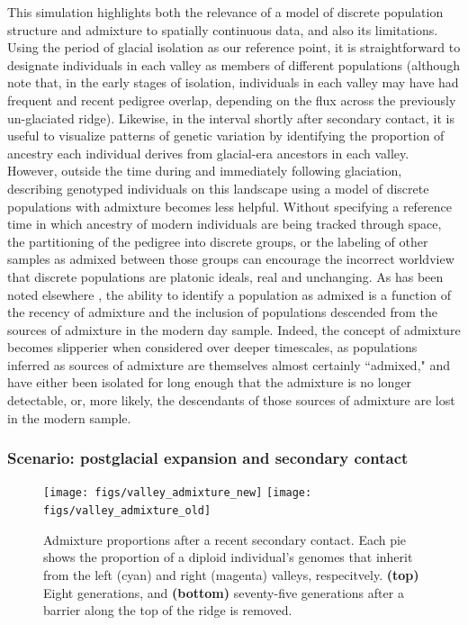 \documentclass{ar-1col}
\begin{document}
This simulation highlights both the relevance of 
a model of discrete population structure and admixture
to spatially continuous data, 
and also its limitations.
Using the period of glacial isolation as our reference point, 
it is straightforward to designate individuals in each valley 
as members of different populations 
(although note that, in the early stages of isolation, 
individuals in each valley may have had frequent 
and recent pedigree overlap, 
depending on the flux across the previously un-glaciated ridge).
Likewise, 
in the interval shortly after secondary contact, 
it is useful to visualize patterns of genetic variation 
by identifying the proportion of ancestry 
each individual derives from glacial-era ancestors in each valley.
However, 
outside the time during and immediately following glaciation, 
describing genotyped individuals on this landscape 
using a model of discrete populations with admixture 
becomes less helpful.
Without specifying a reference time in which ancestry 
of modern individuals are being tracked through space, 
the partitioning of the pedigree into discrete groups, 
or the labeling of other samples as admixed between those groups
can encourage the incorrect worldview that discrete populations are platonic ideals,
real and unchanging.
As has been noted elsewhere 
\citep{reich_india_2009,patterson_ancient_2012,hellenthal2014genetic,lawson2018tutorial},
the ability to identify a population as admixed
is a function of the recency of admixture and
the inclusion of populations descended 
from the sources of admixture in the modern day sample.
Indeed, the concept of admixture becomes slipperier when considered over deeper timescales,
as populations inferred as sources of admixture are themselves almost certainly ``admixed,"
and have either been isolated for long enough that the admixture is no longer detectable,
or, more likely, the descendants of those sources of admixture are lost in the modern sample.


\subsubsection{Scenario: postglacial expansion and secondary contact}


\begin{figure}[ht]
    \centering
        \texttt{[image: figs/valley\_admixture\_new]}
        \texttt{[image: figs/valley\_admixture\_old]}
        \caption{
            Admixture proportions after a recent secondary contact.
            Each pie shows the proportion of a diploid individual's genomes
            that inherit from the left (cyan) and right (magenta) valleys, respecitvely.
            \textbf{(top)} Eight generations, and
            \textbf{(bottom)} seventy-five generations 
            after a barrier along the top of the ridge is removed.
        }
        \label{postglacial_expansion}
\end{figure}
\end{document}
